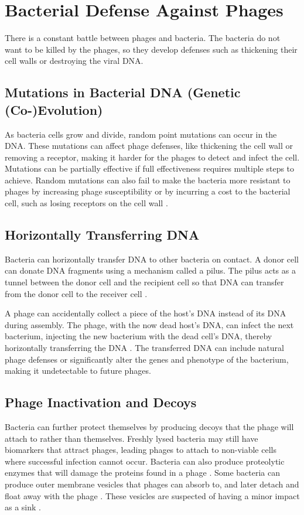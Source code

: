 \section{Bacterial Defense Against Phages} 
\label{sec:literaturereview:bacterial_defense_against_phages}
There is a constant battle between phages and bacteria. 
The bacteria do not want to be killed by the phages, so they develop defenses such as thickening their cell walls or destroying the viral DNA. 

\subsection{Mutations in Bacterial DNA (Genetic (Co-)Evolution)}
As bacteria cells grow and divide, random point mutations can occur in the DNA. 
These mutations can affect phage defenses, like thickening the cell wall or removing a receptor, making it harder for the phages to detect and infect the cell. 
Mutations can be partially effective if full effectiveness requires multiple steps to achieve. 
Random mutations can also fail to make the bacteria more resistant to phages by increasing phage susceptibility or by incurring a cost to the bacterial cell, such as losing receptors on the cell wall \cite{lenskiTWOSTEPRESISTANCEESCHERICHIA1984}. 

\subsection{Horizontally Transferring DNA}
Bacteria can horizontally transfer DNA to other bacteria on contact. 
A donor cell can donate DNA fragments using a mechanism called a pilus. 
The pilus acts as a tunnel between the donor cell and the recipient cell so that DNA can transfer from the donor cell to the receiver cell \cite{harbSsRNAPhagePenetration2020}. 

A phage can accidentally collect a piece of the host's DNA instead of its DNA during assembly. 
The phage, with the now dead host's DNA, can infect the next bacterium, injecting the new bacterium with the dead cell's DNA, thereby horizontally transferring the DNA \cite{tamangHorizontalGeneTransfer2023, kasmanBacteriophages2025}. 
The transferred DNA can include natural phage defenses or significantly alter the genes and phenotype of the bacterium, making it undetectable to future phages. 

\subsection{Phage Inactivation and Decoys}
Bacteria can further protect themselves by producing decoys that the phage will attach to rather than themselves. 
Freshly lysed bacteria may still have biomarkers that attract phages, leading phages to attach to non-viable cells where successful infection cannot occur.
Bacteria can also produce proteolytic enzymes that will damage the proteins found in a phage \cite{tanQuorumSensingDetermines2015}. 
Some bacteria can produce outer membrane vesicles that phages can absorb to, and later detach and float away with the phage \cite{rabinovitchBacterialDebrisEcological2003}. 
These vesicles are suspected of having a minor impact as a sink \cite{bullPhageBacterialDynamicsSpatial2018}. 

